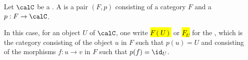 \begin{definition} \label{definition:category_over_a_category_and_fiber_category_over_an_object}
    Let $\calC$ be a .
    A  is a pair $(F, p)$ consisting of a category $F$ and a  $p: F \to \calC$.

    In this case, for an object $U$ of $\calC$, one write \hl{$F(U)$} or \hl{$F_U$} for the , which is the category consisting of the object $u$ in $F$ such that $p(u) = U$ and consisting of the morphisms $f: u \to v$ in $F$ such that $p(f) = \id_U$. 
\end{definition}